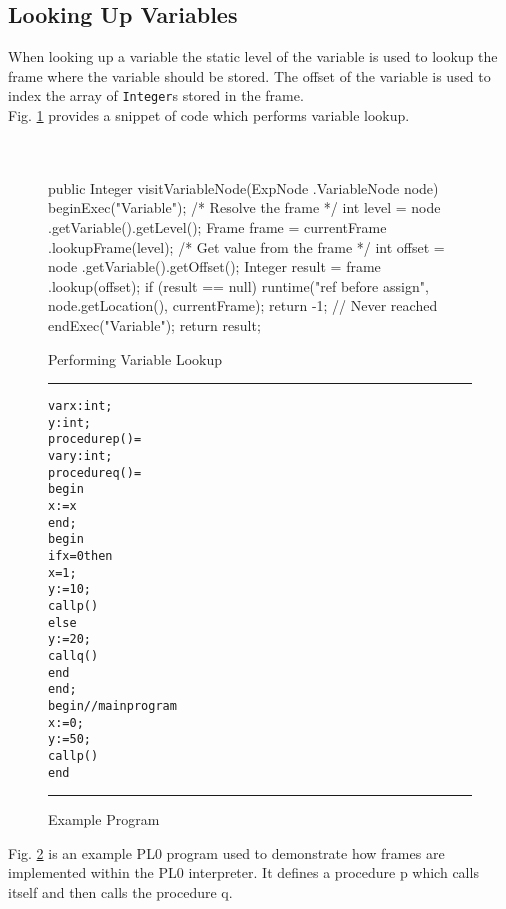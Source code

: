 \documentclass[a4paper,twoside,twocolumn]{article}
\begin{document}
\subsection{Looking Up Variables}\label{section:lookup}
When looking up a variable the static level of the variable is used to lookup
the frame where the variable should be stored. The offset of the variable is
used to index the array of \texttt{Integer}s stored in the frame.\\

Fig. \ref{figure:variablelookup} provides a snippet of code which performs
variable lookup.\\\\\\

\begin{figure}
\begin{java}
public Integer visitVariableNode(ExpNode
        .VariableNode node) {
      beginExec("Variable");
      /* Resolve the frame */
      int level = node
              .getVariable().getLevel();
      Frame frame = currentFrame
              .lookupFrame(level);
      /* Get value from the frame */
      int offset = node
              .getVariable().getOffset();
      Integer result = frame
              .lookup(offset);
      if (result == null) {
          runtime("ref before assign",
                  node.getLocation(),
                  currentFrame);
          return -1; // Never reached
      }
      endExec("Variable");
      return result;
  }
\end{java}
\caption{Performing Variable Lookup}\label{figure:variablelookup}
\end{figure}

\begin{figure}
\rule{\columnwidth}{0.5pt}
\begin{alltt}\sf
var x: int;
    y: int;
procedure p() =
  var y: int;
  procedure q() =
    begin
      x := x
    end;
  begin
    if x = 0 then
      x = 1;
      y := 10;
      call p()
    else
      y := 20;
      call q()
    end
  end;
begin // main program
  x := 0;
  y := 50;
  call p()
end
\end{alltt}
\rule{\columnwidth}{0.5pt}
\caption{Example Program}\label{figure:exampleprog}
\end{figure}

Fig. \ref{figure:exampleprog} is an example PL0 program used to demonstrate
how frames are implemented within the PL0 interpreter. It defines a procedure
p which calls itself and then calls the procedure q.\\
\end{document}
